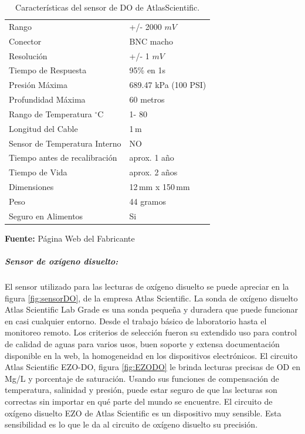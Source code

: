 \begin{table}[H]
\protect\caption[Características del sensor de DO de AtlasScientific]{Características del sensor de DO de AtlasScientific.}
\label{tab:caract_OPR}
\begin{center}
\begin{tabular}{l l}
\hline
Rango   &  +/- 2000     $mV$         \\
Conector &  BNC macho                       \\
Resolución   &  +/- 1 $ mV$              \\
Tiempo de Respuesta   &  95\% en 1s         \\
Presión Máxima    &  689.47 kPa (100 PSI)    \\
Profundidad Máxima	& 60 metros            \\
Rango de Temperatura $^{\circ}$C	& 1- 80\\
Longitud del Cable	& 1 m                    \\
Sensor de Temperatura Interno	& NO        \\
Tiempo antes de recalibración	& aprox. 1 año    \\
Tiempo de Vida	& aprox. 2 años            \\
Dimensiones	& 12 mm x 150 mm                  \\
Peso	& 44 gramos                         \\
Seguro en Alimentos	& Si                    \\
\hline
\end{tabular}
\vspace{5mm}
\newline
\hfill \textbf{Fuente:} P\'agina Web del Fabricante \cite{orp_sensor_measure_nodate}
\end{center}
\end{table}

\subparagraph{Sensor de ox\'igeno disuelto:}
El sensor utilizado para las lecturas de ox\'igeno disuelto se puede apreciar en la figura \ref{fig:sensorDO}, de la empresa Atlas Scientific. La sonda de oxígeno disuelto Atlas Scientific Lab Grade es una sonda pequeña y duradera que puede funcionar en casi cualquier entorno. Desde el trabajo básico de laboratorio hasta el monitoreo remoto. Los criterios de selección fueron su extendido uso para control de calidad de aguas para varios usos, buen soporte y extensa documentación disponible en la web, la homogeneidad en los dispositivos electrónicos. 
El circuito Atlas Scientific EZO-DO, figura \ref{fig:EZODO} le brinda lecturas precisas de OD en Mg/L y porcentaje de saturación. Usando sus funciones de compensación de temperatura, salinidad y presión, puede estar seguro de que las lecturas son correctas sin importar en qué parte del mundo se encuentre. El circuito de oxígeno disuelto EZO de Atlas Scientific es un dispositivo muy sensible. Esta sensibilidad es lo que le da al circuito de oxígeno disuelto su precisión. 

